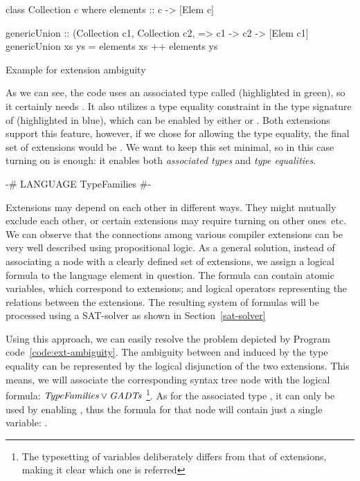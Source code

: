 \documentclass[main.tex]{subfiles}
\begin{document}
	\begin{codeFloat}[H]
		\begin{haskell}
	  class Collection c where
	    elements :: c -> [Elem c]
		  		
	  genericUnion :: (Collection c1, Collection c2, %
	                  => c1 -> c2 -> [Elem c1]
	  genericUnion xs ys = elements xs ++ elements ys
		\end{haskell}
		\caption{Example for extension ambiguity}
		\label{code:ext-ambiguity}
	\end{codeFloat}
	
	As we can see, the code uses an associated type called  (highlighted in green), so  it certainly needs . It also utilizes a type equality constraint in the type signature of  (highlighted in blue), which can be enabled by either  or . Both extensions support this feature, however, if we chose  for allowing the type equality, the final set of extensions would be . We want to keep this set minimal, so in this case turning on  is enough: it enables both \emph{associated types} and \emph{type equalities}.
	
	\begin{oneLineHaskell}
		{-# LANGUAGE TypeFamilies #-}
	\end{oneLineHaskell}
	
	Extensions may depend on each other in different ways. They might mutually exclude each other, or certain extensions may require turning on other ones~etc.	We can observe that the connections among various compiler extensions can be very well described using propositional logic. As a general solution, instead of associating a node with a clearly defined set of extensions, we assign a logical formula to the language element in question. The formula can contain atomic variables, which correspond to extensions; and logical operators representing the relations between the extensions. The resulting system of formulas will be processed using a SAT-solver as shown in Section~\ref{sat-solver}
	
	Using this approach, we can easily resolve the problem depicted by Program code~\ref{code:ext-ambiguity}. The ambiguity between  and  induced by the type equality can be represented by the logical disjunction of the two extensions. This means, we will associate the corresponding syntax tree node with the logical formula: $\textit{TypeFamilies} \lor \textit{GADTs}$ \footnote{The typesetting of variables deliberately differs from that of extensions, making it clear which one is referred}. As for the associated type , it can only be used by enabling , thus the formula for that node will contain just a single variable: .
	
\end{document}
